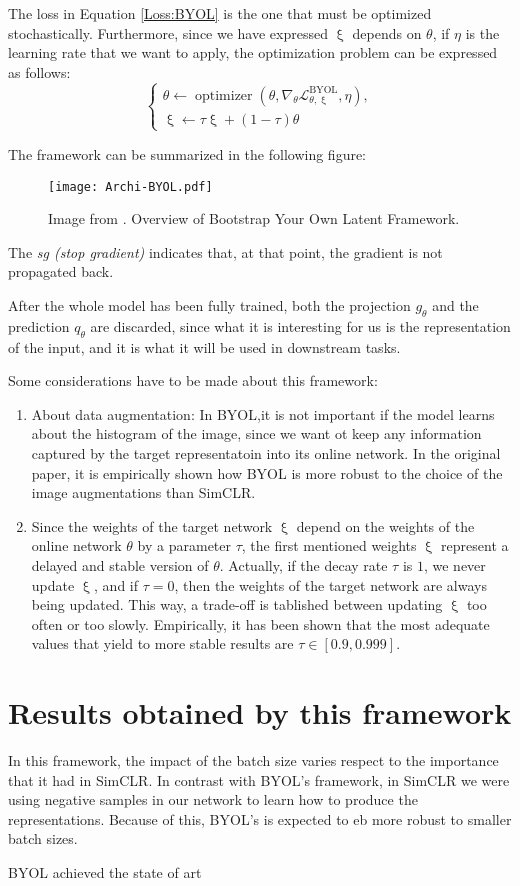 The loss in Equation \eqref{Loss:BYOL} is the one that must be optimized stochastically. Furthermore, since we have expressed $\upxi$ depends on $\theta$, if $\eta$ is the learning rate that we want to apply, the optimization problem can be expressed as follows:
\[
\begin{cases}
    \theta \gets \operatorname{optimizer}\left(\theta,\nabla_\theta \mathcal L_{\theta,\upxi}^{\operatorname{BYOL}},\eta \right), \\
    \upxi \gets \tau \upxi + (1-\tau)\theta 
\end{cases}
\]

The framework can be summarized in the following figure:
\begin{figure}[H]
    \centering 
    \texttt{[image: Archi-BYOL.pdf]}
    \caption{Image from \citep{grill2020bootstrap}. Overview of Bootstrap Your Own Latent Framework. }
\end{figure}

The \emph{sg (stop gradient)} indicates that, at that point, the gradient is not propagated back. 

After the whole model has been fully trained, both the projection $g_\theta$  and the prediction $q_\theta$ are discarded, since what it is interesting for us is the representation of the input, and it is what it will be used in downstream tasks.

Some considerations have to be made about this framework:
\begin{enumerate}
    \item About data augmentation: In BYOL,it is not important if the model learns about the histogram of the image, since we want ot keep any information captured by the target representatoin into its online network. In the original paper, it is empirically shown how BYOL is more robust to the choice of the image augmentations than SimCLR.

    \item Since the weights of the target network $\upxi$ depend on the weights of the online network $\theta$ by a parameter $\tau$, the first mentioned weights $\upxi$ represent a delayed and stable version of $\theta$. Actually, if the decay rate $\tau$ is $1$, we never update $\upxi$, and if $\tau = 0 $, then the weights of the target network are always being updated. This way, a trade-off is tablished between updating $\upxi$ too often or too slowly. Empirically, it has been shown that the most adequate values that yield to more stable results are $\tau \in [0.9,0.999]$.
\end{enumerate}

\section{Results obtained by this framework}

In this framework, the impact of the batch size varies respect to the importance that it had in SimCLR. In contrast with BYOL's framework, in SimCLR we were using negative samples in our network to learn how to produce the representations. Because of this, BYOL's is expected to eb more robust to smaller batch sizes. 

BYOL achieved the state of art 